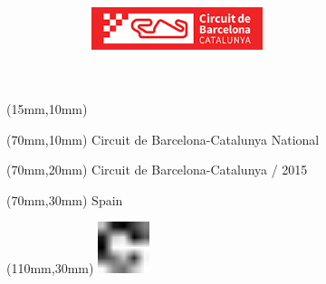 \null\newpage
\begin{textblock*}{50mm}(15mm,10mm)%
\includegraphics[width=50mm]{LG/BAC.png}
\end{textblock*}
\begin{textblock*}{130mm}(70mm,10mm)%
{\fontsize{20}{20}\selectfont Circuit de Barcelona-Catalunya National}\\
\end{textblock*}
\begin{textblock*}{120mm}(70mm,20mm)%
{\fontsize{16}{16}\selectfont Circuit de Barcelona-Catalunya / 2015}\\
\end{textblock*}
\begin{textblock*}{120mm}(70mm,30mm)%
{\fontsize{12}{12}\selectfont Spain}
\end{textblock*}
\begin{textblock*}{30mm}(110mm,30mm)%
\centering
\includegraphics[height=15mm]{icons/fa-rotate-right.pdf}
\end{textblock*}
